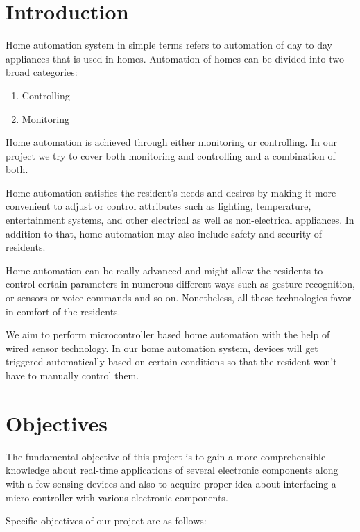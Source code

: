 
\section{Introduction}

Home automation system in simple terms refers to automation of day
to day appliances that is used in homes. Automation of homes can be
divided into two broad categories:

\begin{enumerate}[nosep]
  \item Controlling
  \item Monitoring
\end{enumerate}

Home automation is achieved through either monitoring or controlling.
In our project we try to cover both monitoring and controlling and a
combination of both.

Home automation satisfies the resident’s needs and desires by making
it more convenient to adjust or control attributes such as lighting,
temperature, entertainment systems, and other electrical as well as
non-electrical appliances. In addition to that, home automation may
also include safety and security of residents.

Home automation can be really advanced and might allow the residents
to control certain parameters in numerous different ways such as
gesture recognition, or sensors or voice commands and so on.
Nonetheless, all these technologies favor in comfort of the residents.

We aim to perform microcontroller based home automation with the help
of wired sensor technology. In our home automation system, devices
will get triggered automatically based on certain conditions so that
the resident won't have to manually control them.

\section{Objectives}

The fundamental objective of this project is to gain a more
comprehensible knowledge about real-time applications of several
electronic components along with a few sensing devices and also to
acquire proper idea about interfacing a micro-controller with various
electronic components.

Specific objectives of our project are as follows:

